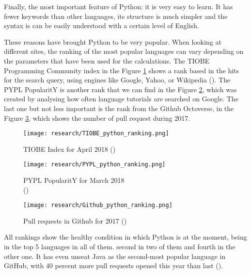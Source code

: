 Finally, the most important feature of Python: it is very easy to learn. It has fewer keywords than other languages, its structure is much simpler and the syntax is can be easily understood with a certain level of English. 

These reasons have brought Python to be very popular. When looking at different sites, the ranking of the most popular languages can vary depending on the parameters that have been used for the calculations. The TIOBE Programming Community index in the Figure \ref{fig:tiobe_rank} shows a rank based in the hits for the search query, using engines like Google, Yahoo, or Wikipedia (\cite{tiobe_index_def}). The PYPL PopularitY is another rank that we can find in the Figure \ref{fig:pypl_rank}, which was created by analysing how often language tutorials are searched on Google. The last one but not less important is the rank from the Github Octoverse, in the Figure \ref{fig:github_octoverse_rank}, which shows the number of pull request during 2017.

\begin{figure}[!ht]
	\centering
	\texttt{[image: research/TIOBE\_python\_ranking.png]}
	\caption{TIOBE Index for April 2018 (\cite{tiobe_index})}
	\label{fig:tiobe_rank}
\end{figure}

\begin{figure}[!ht]
	\centering
	\texttt{[image: research/PYPL\_python\_ranking.png]}
	\caption{PYPL PopularitY for March 2018 \\(\cite{pypl_pop_rank})}
	\label{fig:pypl_rank}
\end{figure}

\begin{figure}[!ht]
	\centering
	\texttt{[image: research/Github\_python\_ranking.png]}
	\caption{Pull requests in Github for 2017 (\cite{octoverse_2017})}
	\label{fig:github_octoverse_rank}
\end{figure}

All rankings show the healthy condition in which Python is at the moment, being in the top 5 languages in all of them. second in two of them and fourth in the other one. It has even unseat Java as the second-most popular language in GitHub, with 40 percent more pull requests opened this year than last (\cite{octoverse_2017}). 